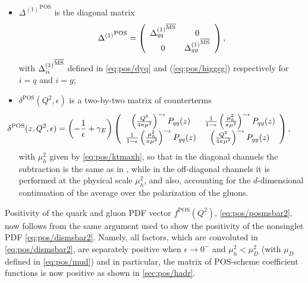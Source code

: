 \begin{itemize}
  \item $ {\Delta^{(1)}}^{{\textrm{POS}}}$ is the diagonal matrix
  \begin{equation}\label{eq:pos/Deltamat}
    {\Delta^{(1)}}^{{\textrm{POS}}}=\left(\begin{array}{cc} {\Delta_{qq}^{(1)}}^{{\overline{\textrm{MS}}}} &
    0 \\0 & {\Delta_{gg}^{(1)}}^{{\overline{\textrm{MS}}}} \end{array}\right),
  \end{equation}
  with  ${\Delta_{ii}^{(1)}}^{{\overline{\textrm{MS}}}}$ defined in \cref{eq:pos/dyq} and
  (\ref{eq:pos/higgsg}) respectively for $i=q$ and $i=g$;
  \item $\delta^{{\textrm{POS}}} (Q^2,\epsilon)$ is a two-by-two matrix of
    counterterms
  \begin{equation}\label{eq:pos/deltamat}
  \hspace*{-3em}\delta^{{\textrm{POS}}} (z,Q^2,\epsilon)= \left(-\frac 1
      {\epsilon}+\gamma_E\right) \left(\begin{array}{cc}  \left(\frac{Q^2}{4\pi
        \mu^2}\right)^{-\epsilon} P_{qq}(z) & \frac{1}{1-\epsilon}\left(\frac{\mu_h^2}{\pi\mu^2}\right)^{-\epsilon} 
    P_{qg}(z)   \\\frac{1}{1-\epsilon}\left(\frac{\mu_h^2}{\pi\mu^2}\right)^{-\epsilon} P_{gq}(z)  & \left(\frac{Q^2}{4\pi
        \mu^2}\right)^{-\epsilon} P_{gg}(z)  \end{array}\right),
  \end{equation}
  with $\mu_h^2$ given by  \cref{eq:pos/ktmaxh}, so that in the
  diagonal channels the subtraction is the same as in \msbar{}, while in
  the off-diagonal channels it is performed at the physical scale
  $\mu_h^2$, and also, accounting for the $d$-dimensional continuation of
  the  average over the polarization of the gluons.
\end{itemize}

Positivity of the quark and gluon PDF vector $ f^{{\textrm{POS}}}(Q^2)$,
\cref{eq:pos/posmsbar2}, now follows from the same argument used to
show the positivity of the nonsinglet PDF 
\cref{eq:pos/dismsbar2}. Namely, all
factors, which are convoluted in \cref{eq:pos/dismsbar2}, are 
separately positive when $\epsilon \to 0^-$ and  $\mu_h^2 < \mu_D^2$ (with
$\mu_D$ defined in \cref{eq:pos/mud}) and in particular, the matrix of POS-scheme coefficient
functions is now positive as shown in \cref{sec:pos/hadr}.

